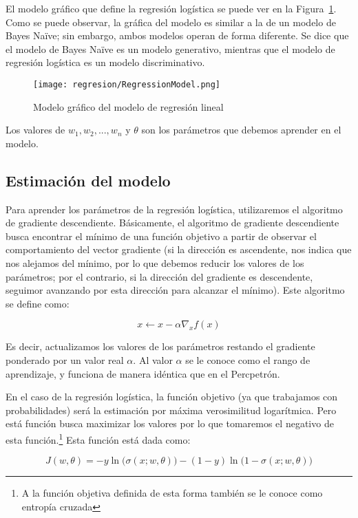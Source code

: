 El modelo gráfico que define la regresión logística se puede ver en la Figura~\ref{Fig:LinearReg}. Como se puede observar, la gráfica del modelo es similar a la de un modelo de Bayes Naïve; sin embargo, ambos modelos operan de forma diferente. Se dice que el modelo de Bayes Naïve es un modelo generativo, mientras que el modelo de regresión logística es un modelo discriminativo.

\begin{figure}
 \centering
 \texttt{[image: regresion/RegressionModel.png]}
 \caption{Modelo gráfico del modelo de regresión lineal}\label{Fig:LinearReg}
\end{figure}    


Los valores de $w_1, w_2, ..., w_n$ y $\theta$ son los parámetros que debemos aprender en el modelo. 



\subsection{Estimación del modelo}

Para aprender los parámetros de la regresión logística, utilizaremos el algoritmo de gradiente descendiente. Básicamente, el algoritmo de gradiente descendiente busca encontrar el mínimo de una función objetivo a partir de observar el comportamiento del vector gradiente (si la dirección es ascendente, nos indica que nos alejamos del mínimo, por lo que debemos reducir los valores de los parámetros; por el contrario, si la dirección del gradiente es descendente, seguimor avanzando por esta dirección para alcanzar el mínimo). Este algoritmo se define como:

$$ x \leftarrow x - \alpha \nabla_x f(x) $$

Es decir, actualizamos los valores de los parámetros restando el gradiente ponderado por un valor real $\alpha$. Al valor $\alpha$ se le conoce como el rango de aprendizaje, y funciona de manera idéntica que en el Percpetrón.

En el caso de la regresión logística, la función objetivo (ya que trabajamos con probabilidades) será la estimación por máxima verosimilitud logarítmica. Pero está función busca maximizar los valores por lo que tomaremos el negativo de esta función.\footnote{A la función objetiva definida de esta forma también se le conoce como entropía cruzada} Esta función está dada como:

\begin{equation*}
    J(w, \theta) = - y \ln\big( \sigma(x; w, \theta)\big) - (1- y) \ln\big( 1-\sigma(x; w, \theta) \big)
\end{equation*}

